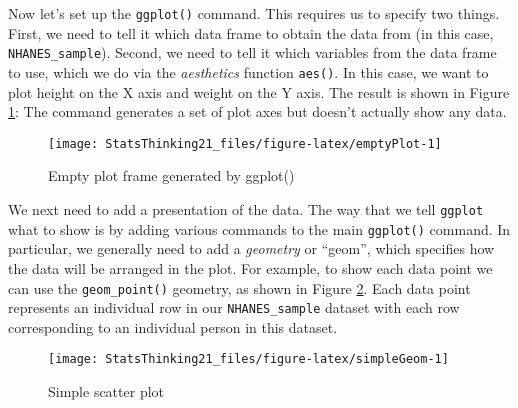 \documentclass[]{book}
\newenvironment{Shaded}{\begin{snugshade}}{\end{snugshade}}
\newcommand{\KeywordTok}[1]{\textcolor[rgb]{0.13,0.29,0.53}{\textbf{#1}}}
\newcommand{\DataTypeTok}[1]{\textcolor[rgb]{0.13,0.29,0.53}{#1}}
\newcommand{\StringTok}[1]{\textcolor[rgb]{0.31,0.60,0.02}{#1}}
\newcommand{\OperatorTok}[1]{\textcolor[rgb]{0.81,0.36,0.00}{\textbf{#1}}}
\newcommand{\NormalTok}[1]{#1}
\theoremstyle{definition}
\theoremstyle{definition}
\theoremstyle{definition}
\theoremstyle{remark}
\begin{document}
Now let's set up the \texttt{ggplot()} command. This requires us to
specify two things. First, we need to tell it which data frame to obtain
the data from (in this case, \texttt{NHANES\_sample}). Second, we need
to tell it which variables from the data frame to use, which we do via
the \emph{aesthetics} function \texttt{aes()}. In this case, we want to
plot height on the X axis and weight on the Y axis. The result is shown
in Figure \ref{fig:emptyPlot}: The command generates a set of plot axes
but doesn't actually show any data.

\begin{Shaded}
\end{Shaded}

\begin{figure}
\texttt{[image: StatsThinking21\_files/figure-latex/emptyPlot-1]} \caption{Empty plot frame generated by ggplot()}\label{fig:emptyPlot}
\end{figure}

We next need to add a presentation of the data. The way that we tell
\texttt{ggplot} what to show is by adding various commands to the main
\texttt{ggplot()} command. In particular, we generally need to add a
\emph{geometry} or ``geom'', which specifies how the data will be
arranged in the plot. For example, to show each data point we can use
the \texttt{geom\_point()} geometry, as shown in Figure
\ref{fig:simpleGeom}. Each data point represents an individual row in
our \texttt{NHANES\_sample} dataset with each row corresponding to an
individual person in this dataset.

\begin{Shaded}
\end{Shaded}

\begin{figure}
\texttt{[image: StatsThinking21\_files/figure-latex/simpleGeom-1]} \caption{Simple scatter plot}\label{fig:simpleGeom}
\end{figure}
\end{document}
